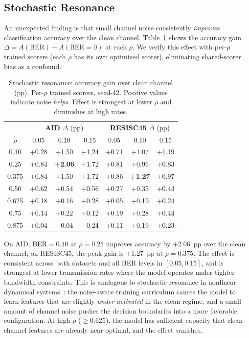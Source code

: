 \documentclass[conference]{IEEEtran}
\begin{document}
\subsection{Stochastic Resonance}
\label{sec:resonance}

An unexpected finding is that small channel noise consistently \emph{improves} classification accuracy over the clean channel. Table~\ref{tab:resonance} shows the accuracy gain $\Delta = A(\text{BER}) - A(\text{BER}{=}0)$ at each $\rho$. We verify this effect with per-$\rho$ trained scorers (each $\rho$ has its own optimized scorer), eliminating shared-scorer bias as a confound.

\begin{table}[t]
\renewcommand{\arraystretch}{1.12}
\centering
\small
\caption{Stochastic resonance: accuracy gain over clean channel (pp). Per-$\rho$ trained scorers, seed-42. Positive values indicate noise \emph{helps}. Effect is strongest at lower $\rho$ and diminishes at high rates.}
\label{tab:resonance}
\setlength{\tabcolsep}{2.5pt}
\begin{tabular}{c cc cc cc}
\toprule
& \multicolumn{3}{c}{\textbf{AID} $\Delta$ (pp)} & \multicolumn{3}{c}{\textbf{RESISC45} $\Delta$ (pp)} \\
$\rho$ & 0.05 & 0.10 & 0.15 & 0.05 & 0.10 & 0.15 \\
\midrule
0.10 & +0.28 & +1.50 & +1.24 & +0.71 & +1.07 & +1.19 \\
0.25 & +0.84 & \textbf{+2.06} & +1.72 & +0.81 & +0.96 & +0.83 \\
0.375 & +0.84 & +1.50 & +1.72 & +0.86 & \textbf{+1.27} & +0.97 \\
0.50 & +0.62 & +0.54 & +0.56 & +0.27 & +0.35 & +0.44 \\
0.625 & +0.18 & +0.16 & +0.28 & +0.05 & +0.19 & +0.24 \\
0.75 & +0.14 & +0.22 & +0.12 & +0.19 & +0.28 & +0.44 \\
0.875 & +0.04 & $-$0.04 & $-$0.24 & +0.11 & +0.19 & +0.23 \\
\bottomrule
\end{tabular}
\end{table}

On AID, BER$=0.10$ at $\rho{=}0.25$ improves accuracy by $+$2.06~pp over the clean channel; on RESISC45, the peak gain is $+$1.27~pp at $\rho{=}0.375$. The effect is consistent across both datasets and all BER levels in $[0.05, 0.15]$, and is strongest at lower transmission rates where the model operates under tighter bandwidth constraints. This is analogous to stochastic resonance in nonlinear dynamical systems~\cite{gammaitoni1998stochastic}: the noise-aware training curriculum causes the model to learn features that are slightly \emph{under-activated} in the clean regime, and a small amount of channel noise pushes the decision boundaries into a more favorable configuration. At high $\rho$ ($\geq$0.625), the model has sufficient capacity that clean-channel features are already near-optimal, and the effect vanishes.
\end{document}

